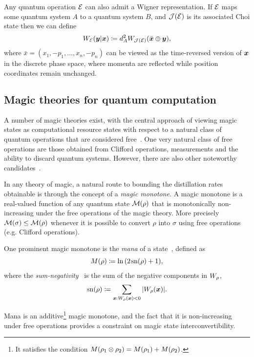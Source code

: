 \documentclass[pra,
aps,
twocolumn,
superscriptaddress,
groupedaddress,
nofootinbib,
reprint
]{revtex4-1}
\begin{document}
Any quantum operation ${\mathcal E}$ can also admit a Wigner representation. If ${\mathcal E}$ maps some quantum system $A$ to a quantum system $B$, and $\mathcal{J}({\mathcal E})$ is its associated Choi state then we can define
\begin{equation}
W_{{\mathcal E}}(\boldsymbol{y} |\boldsymbol{x}) \coloneqq d_A^2 W_{\mathcal{J}({\mathcal E})}(\bar{\boldsymbol{x}} \oplus \boldsymbol{y}),
\end{equation}
where $\bar{x} =(x_1, -p_1, \dots , x_n, -p_n)$ can be viewed as the time-reversed version of $\boldsymbol{x}$ in the discrete phase space, where momenta are reflected while position coordinates remain unchanged.

\subsection{Magic theories for quantum computation}
\label{sec:mono}

A number of magic theories exist, with the central approach of viewing magic states as computational resource states with respect to a natural class of quantum operations that are considered free~\cite{Gour_2019}. One very natural class of free operations are those obtained from Clifford operations, measurements and the ability to discard quantum systems. However, there are also other noteworthy candidates~\cite{cit:ahmadi, cit:seddon, Wang_2019}.

In any theory of magic, a natural route to bounding the distillation rates obtainable is through the concept of a \emph{magic monotone}. A magic monotone is a real-valued function of any quantum state ${\mathcal M}(\rho)$ that is monotonically non-increasing under the free operations of the magic theory. More precisely ${\mathcal M}(\sigma) \le {\mathcal M}(\rho)$ whenever it is possible to convert $\rho$ into $\sigma$ using free operations (e.g. Clifford operations).

One prominent magic monotone is the \emph{mana} of a state~\cite{cit:veitch2}, defined as
\begin{equation}
    {M(\rho)} \coloneqq \ln{(2\hspace{1pt} {{\rm{sn}}(\rho)} +1)},
\end{equation}
where the \emph{sum-negativity}~\cite{cit:veitch2} is the sum of the negative components in $\W{\rho}$,
\begin{equation}
    \sn{\rho} \coloneqq \sum\limits_{\bmx: \W[\bmx]{\rho} < 0} \abs{\W[\bmx]{\rho}}.
\end{equation}

Mana is an additive\footnote{It satisfies the condition ${M(\rho_1 \otimes \rho_2)} = {M(\rho_1)} + {M(\rho_2)}$.} magic monotone, and the fact that it is non-increasing under free operations provides a constraint on magic state interconvertibility.
\end{document}
